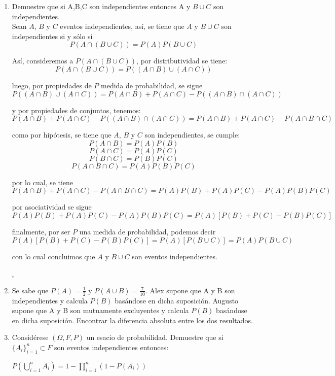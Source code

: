 \documentclass[12pt,a4paper]{report}
\begin{document}
\begin{enumerate}
   \item {
   Demuestre que si A,B,C son independientes entonces A y $B\cup C$ son independientes.\\
    Sean $A$, $B$ y  $C$ eventos independientes, así, se tiene que $A$ y $B \cup C$
	son independientes si y sólo si
		$$ P(A\cap(B \cup C)) = P(A)P(B \cup C) $$

	Así, consideremos a $ P(A\cap(B \cup C)) $, por distributividad
	se tiene:
		$$ P(A\cap(B \cup C)) = P((A \cap B) \cup (A \cap C)) $$

	luego, por propiedades de $P$ medida de probabilidad, se sigue
		$$ P((A \cap B) \cup (A \cap C)) = P(A \cap B) + P(A \cap C) - P((A \cap B) \cap (A \cap C)) $$

	y por propiedades de conjuntos, tenemos:
		$$ P(A \cap B) + P(A \cap C) - P((A \cap B) \cap (A \cap C)) = P(A \cap B) + P(A \cap C) - P(A \cap B \cap C) $$

	como por hipótesis, se tiene que $A$, $B$ y $C$ son independientes, se cumple:
		$$ P(A \cap B) = P(A)P(B) $$
		$$ P(A \cap C) = P(A)P(C) $$
		$$ P(B \cap C) = P(B)P(C) $$
		$$ P(A \cap B \cap C) = P(A)P(B)P(C) $$

	por lo cual, se tiene
		$$ P(A \cap B) + P(A \cap C) - P(A \cap B \cap C) = P(A)P(B) + P(A)P(C) - P(A)P(B)P(C) $$

	por asociatividad se sigue
		$$ P(A)P(B) + P(A)P(C) - P(A)P(B)P(C) = P(A)[P(B) + P(C) - P(B)P(C)] $$

	finalmente, por ser $P$ una medida de probabilidad, podemos decir
		$$ P(A)[P(B) + P(C) - P(B)P(C)] = P(A)[P(B \cup C)] = P(A)P(B \cup C) $$

	con lo cual concluimos que $A$ y $B \cup C$ son eventos independientes.

	\begin{flushright}
		$_{\square}$
	\end{flushright}

	}

   \item {
   Se sabe que $P(A)= \frac{1}{2}$ y $P(A\cup B)=\frac{7}{10}$. Alex supone que A y B son independientes y calcula $P(B)$ basándose en dicha suposición. Augusto supone que A y B son mutuamente excluyentes y calcula $P(B)$ basándose en dicha suposición. Encontrar la diferencia absoluta entre los dos resultados.
	}

   \item {
   Considérese $(\Omega,F, P)$ un esacio de probabilidad. Demuestre que si $\lbrace A_{i} \rbrace _{i=1}^{n} \subset F$ son eventos independientes entonces:\\
   \begin{center}
   $P(\bigcup\limits_{i=1}^{n} A_{i})=1-\prod\limits_{i=1}^{n} (1-P(A_{i}))$
   \end{center}
	}


\end{enumerate}
\end{document}
